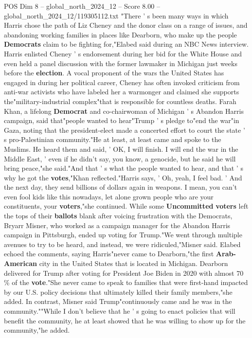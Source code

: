 \begin{textsample}{POS Dim 8 – global\_north\_2024\_12 – Score 8.00 – global\_north\_2024\_12/119305112.txt}  \label{ex:f8_pos_340}
"There ' s been many ways in which Harris chose the path of Liz Cheney and the donor class on a range of issues, and abandoning working families in places like Dearborn, who make up the people \textbf{Democrats} claim to be fighting for,"Elabed said during an NBC News interview.
Harris enlisted Cheney ' s endorsement during her bid for the White House and even held a panel discussion with the former lawmaker in Michigan just weeks before the \textbf{election}.
A vocal proponent of the wars the United States has engaged in during her political career, Cheney has often invoked criticism from anti-war activists who have labeled her a warmonger and claimed she supports the"military-industrial complex"that is responsible for countless deaths.
Farah Khan, a lifelong \textbf{Democrat} and co-chairwoman of Michigan ' s Abandon Harris campaign, said that"people wanted to hear"Trump ' s pledge to"end the war"in Gaza, noting that the president-elect made a concerted effort to court the state ' s pro-Palestinian community."He at least, at least came and spoke to the Muslims.
He heard them and said, ' OK, I will finish.
I will end the war in the Middle East, ' even if he didn't say, you know, a genocide, but he said he will bring peace,"she said."And that ' s what the people wanted to hear, and that ' s why he got the \textbf{votes},"Khan reflected."Harris says, ' Oh, yeah, I feel bad. ' And the next day, they send billions of dollars again in weapons.
I mean, you can't even fool kids like this nowadays, let alone grown people who are your constituents, your \textbf{voters},"she continued.
While some \textbf{Uncommitted} \textbf{voters} left the tops of their \textbf{ballots} blank after voicing frustration with the Democrats, Bryarr Misner, who worked as a campaign manager for the Abandon Harris campaign in Pittsburgh, ended up voting for Trump."We went through multiple avenues to try to be heard, and instead, we were ridiculed,"Misner said.
Elabed echoed the comments, saying Harris"never came to Dearborn,"the first \textbf{Arab-American} city in the United States that is located in Michigan.
Dearborn delivered for Trump after voting for President Joe Biden in 2020 with almost 70 \% of the \textbf{vote}."She never came to speak to families that were first-hand impacted by our U.S. policy decisions that ultimately killed their family members,"she added.
In contrast, Misner said Trump"continuously came and he was in the community.""While I don't believe that he ' s going to enact policies that will benefit the community, he at least showed that he was willing to show up for the community,"he added.

\end{textsample}
